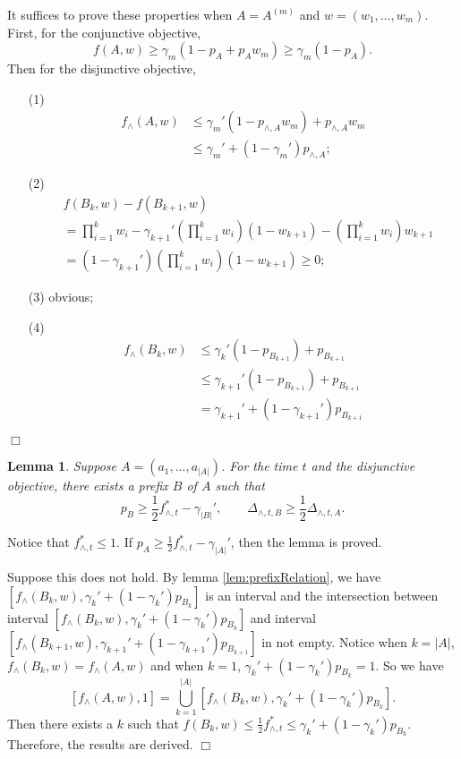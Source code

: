 \documentclass{article}
\newcommand{\abs}[1]{\left| #1 \right|}
\newtheorem{lemma}[theorem]{Lemma}%
\newenvironment{proof}{\noindent {\textbf{Proof. }}}{$\Box$ \medskip}
\begin{document}
\begin{proof}
It suffices to prove these properties when $A = A^{(m)}$ and $w = (w_1, \ldots, w_m)$. First, for the conjunctive objective,
$$
f(A, w) \geq \gamma_{m} (1 - p_{A} + p_{A} w_{m}) \geq \gamma_{m} (1 - p_{A}).
$$
Then for the disjunctive objective,
\begin{itemize}
\item[(1)]
\begin{align*}
f_{\wedge}(A, w) &\leq \gamma_m'(1 - p_{\wedge, A} w_m) + p_{\wedge, A} w_m \\
&\leq \gamma_m' + (1 - \gamma_m') p_{\wedge, A};
\end{align*}


\item[(2)]
\begin{align*}
&f(B_k, w) - f(B_{k+1}, w)\\
&=\prod_{i=1}^{k}w_i - \gamma_{k+1}' (\prod_{i=1}^{k}w_i) (1 - w_{k+1}) - (\prod_{i=1}^{k}w_i) w_{k+1}\\
&=(1 - \gamma_{k+1}') (\prod_{i=1}^{k}w_i) (1 - w_{k+1}) \geq 0;
\end{align*}

\item[(3)]
obvious;

\item[(4)]
\begin{align*}
f_{\wedge}(B_k, w) &\leq \gamma_{k}' (1 - p_{B_{k+1}}) + p_{B_{k+1}}\\
&\leq \gamma_{k+1}' (1 - p_{B_{k+1}}) + p_{B_{k+1}} \\
&= \gamma_{k+1}' + (1 - \gamma_{k+1}') p_{B_{k+1}}
\end{align*}
\end{itemize}
\end{proof}

\begin{lemma}
Suppose $A = (a_1, ..., a_{\abs{A}})$. For the time $t$ and the disjunctive objective, there exists a prefix $B$ of $A$ such that 
$$
p_{B} \geq \frac{1}{2}f_{\wedge, t}^{\ast} - \gamma_{\abs{B}}', \qquad \Delta_{\wedge, t, B} \geq \frac{1}{2}\Delta_{\wedge, t, A}.
$$ 
\end{lemma}
\begin{proof}
Notice that $f_{\wedge, t}^{\ast} \leq 1$. If $p_{A} \geq \frac{1}{2}f_{\wedge, t}^{\ast} - \gamma_{\abs{A}}'$, then the lemma is proved. 

Suppose this does not hold. By lemma \ref{lem:prefixRelation}, we have $[f_{\wedge}(B_k,w), \gamma_k' + (1 - \gamma_k')p_{B_k}]$ is an interval and the intersection between interval $[f_{\wedge}(B_k,w), \gamma_k' + (1 - \gamma_k')p_{B_k}]$ and interval $[f_{\wedge}(B_{k+1},w), \gamma_{k+1}' + (1 - \gamma_{k+1}')p_{B_{k+1}}]$ in not empty. Notice when $k=\abs{A}$, $f_{\wedge}(B_k,w) = f_{\wedge}(A, w)$ and when $k = 1$, $\gamma_k' + (1 - \gamma_k')p_{B_k} = 1$. So we have
$$
[f_{\wedge}(A,w), 1] = \bigcup_{k=1}^{\abs{A}} [f_{\wedge}(B_k,w), \gamma_k' + (1 - \gamma_k')p_{B_k}].
$$
Then there exists a $k$ such that $f(B_k,w) \leq \frac{1}{2}f_{\wedge, t}^{\ast} \leq \gamma_k' + (1 - \gamma_k')p_{B_k}$. Therefore, the results are derived.
\end{proof}
\end{document}
